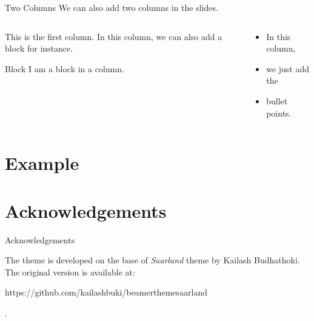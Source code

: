 \documentclass[aspectratio=169]{beamer}
\begin{document}
	\begin{frame}{Two Columns}
		We can also add two columns in the slides.
		\begin{columns}[t]
			\begin{column}[T]{0.4\textwidth}
				This is the first column. In this column, we can also add a block for instance.
				\vspace{1em}
				\begin{block}{Block}
					I am a block in a column.
				\end{block}
			\end{column}
			\begin{column}[T]{0.4\textwidth}
				\begin{itemize}
					\item In this column,
					\item we just add the
					\item bullet points.
				\end{itemize}
			\end{column}
		\end{columns}
	\end{frame}

\section{Example}

\section{Acknowledgements}

\begin{frame}{Acknowledgements}
	
		The theme is developed on the base of \textsl{Saarland} theme by Kailash Budhathoki. The original version is available at:
		\begin{url}
		https://github.com/kailashbuki/beamerthemesaarland
		\end{url}.
\end{frame}
	
		
		
	
\end{document}
